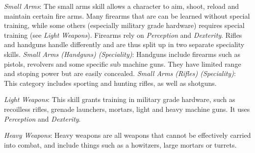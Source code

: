 \documentclass[11pt,a4paper,openany]{scrbook}
\begin{document}
\linebreak
\emph{Small Arms}: The small arms skill allows a character to aim, shoot, reload
and maintain certain fire arms. Many firearms that are can be learned without
special training, while some others (especially military grade hardware)
requires special training (see \emph{Light Weapons}). Firearms rely on
\emph{Perception} and \emph{Dexterity}. Rifles and handguns handle differently
and are thus split up in two separate speciality skills.
\emph{Small Arms (Handguns) (Speciality)}: Handguns include firearms such as
pistols, revolvers and some specific sub machine guns. They have limited range
and stoping power but are easily concealed.
\emph{Small Arms (Rifles) (Speciality)}: This category includes sporting and
hunting rifles, as well as shotguns.

\linebreak
\emph{Light Weapons}: This skill grants training in military grade hardware,
such as recoilless rifles, grenade launchers, mortars, light and heavy machine
guns. It uses \emph{Perception} and \emph{Dexterity}.

\linebreak
\emph{Heavy Weapons}: Heavy weapons are all weapons that cannot be effectively
carried into combat, and include things such as a howitzers, large mortars or
turrets.
\end{document}
